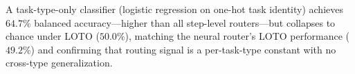 
A task-type-only classifier (logistic regression on one-hot task identity) achieves $64.7\%$ balanced accuracy---higher than all step-level routers---but collapses to chance under LOTO ($50.0\%$), matching the neural router's LOTO performance ($49.2\%$) and confirming that routing signal is a per-task-type constant with no cross-type generalization.

%
%
%
%
